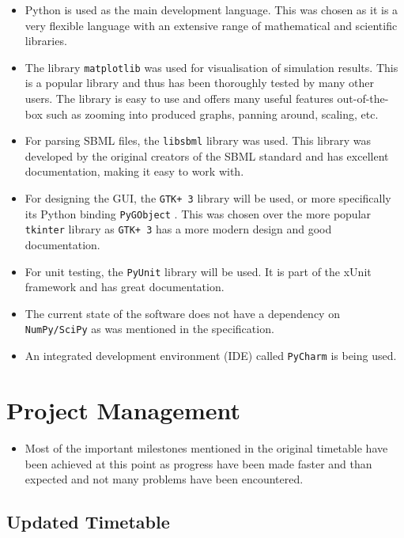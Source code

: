 \documentclass{article}
\begin{document}
	\begin{itemize}
		\item Python is used as the main development language. This was chosen as it is a very flexible language with an extensive range of mathematical and scientific libraries.
		\item The library \verb|matplotlib| \cite{matplotlib} was used for visualisation of simulation results. This is a popular library and thus has been thoroughly tested by many other users. The library is easy to use and offers many useful features out-of-the-box such as zooming into produced graphs, panning around, scaling, etc.
		\item For parsing SBML files, the \verb|libsbml| \cite{libsbml} library was used. This library was developed by the original creators of the SBML standard and has excellent documentation, making it easy to work with.
		\item For designing the GUI, the \verb|GTK+ 3| \cite{gtk} library will be used, or more specifically its Python binding \verb|PyGObject| \cite{gtk_python}. This was chosen over the more popular \verb|tkinter| \cite{tkinter} library as \verb|GTK+ 3| has a more modern design and good documentation.
		\item For unit testing, the \verb|PyUnit| \cite{pyunit} library will be used. It is part of the xUnit framework and has great documentation.
		\item The current state of the software does not have a dependency on \verb|NumPy/SciPy| \cite{numpy, scipy} as was mentioned in the specification.
		\item An integrated development environment (IDE) called \verb|PyCharm| \cite{pycharm} is being used.	
\end{itemize}
	
	
	
	\section{Project Management}
	\begin{itemize}
		\item Most of the important milestones mentioned in the original timetable have been achieved at this point as progress have been made faster and than expected and not many problems have been encountered.
	\end{itemize}
	
	\subsection{Updated Timetable}
	
\end{document}
